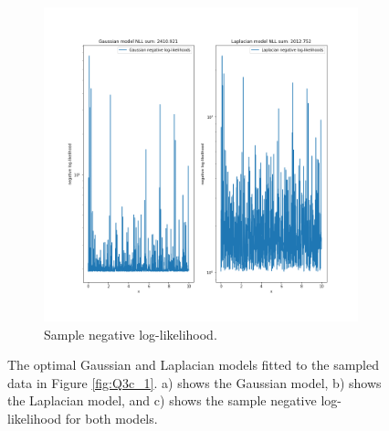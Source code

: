 \documentclass{article}
\begin{document}
\begin{figure}[!htb]
     \begin{subfigure}[b]{0.6\textwidth}
         \centering
         \includegraphics[width=\textwidth]{Q3c_fig5.png}
         \caption{Sample negative log-likelihood.}
     \end{subfigure}
        \caption{The optimal Gaussian and Laplacian models fitted to the sampled data in Figure \ref{fig:Q3c_1}. a) shows the Gaussian model, b) shows the Laplacian model, and c) shows the sample negative log-likelihood for both models.}
        \label{fig:Q3c_2}
\end{figure}
\end{document}
